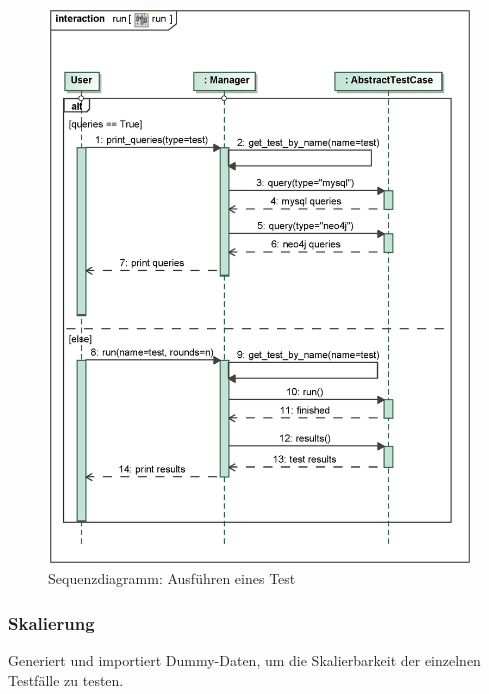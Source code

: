 \begin{figure}[H]
    \myfloatalign
    \includegraphics[width=\textwidth]{gfx/MtGDeepAnalysis/cli_run.eps}
    \caption{Sequenzdiagramm: Ausführen eines Test}
    \label{fig:seq:run}
\end{figure}


\subsubsection{Skalierung}
Generiert und importiert Dummy-Daten, um die Skalierbarkeit der einzelnen Testfälle zu testen.

